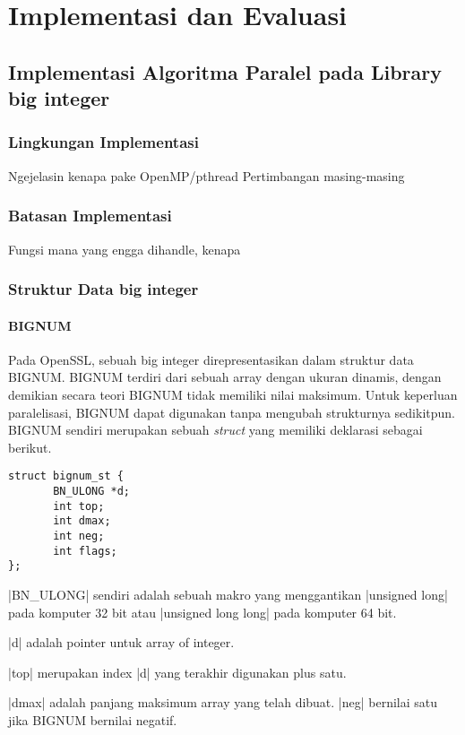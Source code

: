 \chapter{Implementasi dan Evaluasi}

\section{Implementasi Algoritma Paralel pada Library big integer}
\subsection{Lingkungan Implementasi}
Ngejelasin kenapa pake OpenMP/pthread
Pertimbangan masing-masing

\subsection{Batasan Implementasi}
Fungsi mana yang engga dihandle, kenapa

\subsection{Struktur Data big integer}
\subsubsection{BIGNUM}
Pada OpenSSL, sebuah big integer direpresentasikan dalam struktur data BIGNUM. BIGNUM terdiri dari sebuah array dengan ukuran dinamis, dengan demikian secara teori BIGNUM tidak memiliki nilai maksimum. Untuk keperluan paralelisasi, BIGNUM dapat digunakan tanpa mengubah strukturnya sedikitpun. BIGNUM sendiri merupakan sebuah \textit{struct} yang memiliki deklarasi sebagai berikut.

\begin{lstlisting}[caption=Struktur BIGNUM]
struct bignum_st {
       BN_ULONG *d;
       int top;
       int dmax;
       int neg;
       int flags;
};
\end{lstlisting}

|BN_ULONG| sendiri adalah sebuah makro yang menggantikan |unsigned long| pada komputer 32 bit atau |unsigned long long| pada komputer 64 bit.

|d| adalah pointer untuk array of integer.

|top| merupakan index |d| yang terakhir digunakan plus satu.

|dmax| adalah panjang maksimum array yang telah dibuat. |neg| bernilai satu jika BIGNUM bernilai negatif.

